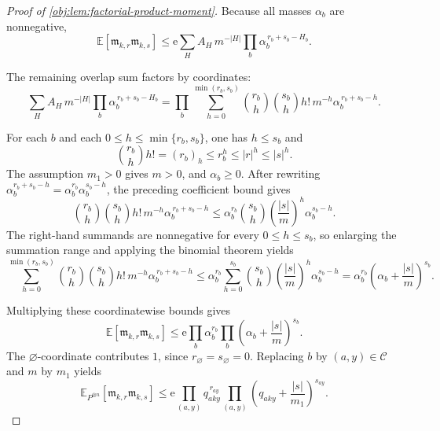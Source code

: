 \begin{proof}[Proof of \cref{obj:lem:factorial-product-moment}]
Because all masses \(\alpha_b\) are nonnegative,
\[
\mathbb E\!\left[
\mathfrak m_{k,r}\mathfrak m_{k,s}
\right]
\le
\mathrm e
\sum_H
A_H\,m^{-|H|}
\prod_b \alpha_b^{\,r_b+s_b-H_b}.
\]

The remaining overlap sum factors by coordinates:
\[
\sum_H
A_H\,m^{-|H|}
\prod_b \alpha_b^{\,r_b+s_b-H_b}
=
\prod_b
\sum_{h=0}^{\min(r_b,s_b)}
{r_b\choose h}{s_b\choose h}h!\,m^{-h}
\alpha_b^{\,r_b+s_b-h}.
\]

For each \(b\) and each \(0\le h\le\min\{r_b,s_b\}\), one has \(h\le s_b\) and
\[
{r_b\choose h}h!=(r_b)_h\le r_b^h\le |r|^h\le |s|^h .
\]
The assumption \(m_1>0\) gives \(m>0\), and \(\alpha_b\ge0\).  After rewriting
\(\alpha_b^{r_b+s_b-h}=\alpha_b^{r_b}\alpha_b^{s_b-h}\), the preceding coefficient bound gives
\[
{r_b\choose h}{s_b\choose h}h!\,m^{-h}
\alpha_b^{\,r_b+s_b-h}
\le
\alpha_b^{r_b}{s_b\choose h}
\left(\frac{|s|}{m}\right)^h
\alpha_b^{s_b-h}.
\]
The right-hand summands are nonnegative for every \(0\le h\le s_b\), so enlarging the summation range and applying the binomial theorem yields
\[
\sum_{h=0}^{\min(r_b,s_b)}
{r_b\choose h}{s_b\choose h}h!\,m^{-h}
\alpha_b^{\,r_b+s_b-h}
\le
\alpha_b^{r_b}
\sum_{h=0}^{s_b}{s_b\choose h}
\left(\frac{|s|}{m}\right)^h
\alpha_b^{s_b-h}
=
\alpha_b^{r_b}
\left(\alpha_b+\frac{|s|}{m}\right)^{s_b}.
\]

Multiplying these coordinatewise bounds gives
\[
\mathbb E\!\left[
\mathfrak m_{k,r}\mathfrak m_{k,s}
\right]
\le
\mathrm e
\prod_{b}\alpha_b^{r_b}
\prod_b\left(\alpha_b+\frac{|s|}{m}\right)^{s_b}.
\]
The \(\varnothing\)-coordinate contributes \(1\), since \(r_{\varnothing}=s_{\varnothing}=0\).  Replacing \(b\) by \((a,y)\in\mathcal C\) and \(m\) by \(m_1\) yields
\[
\mathbb E_{P^{\otimes n}}\!\left[\mathfrak m_{k,r}\mathfrak m_{k,s}\right]
\le
\mathrm e
\prod_{(a,y)}q_{aky}^{\,r_{ay}}
\prod_{(a,y)}
\left(q_{aky}+\frac{|s|}{m_1}\right)^{s_{ay}} .
\]
\end{proof}
